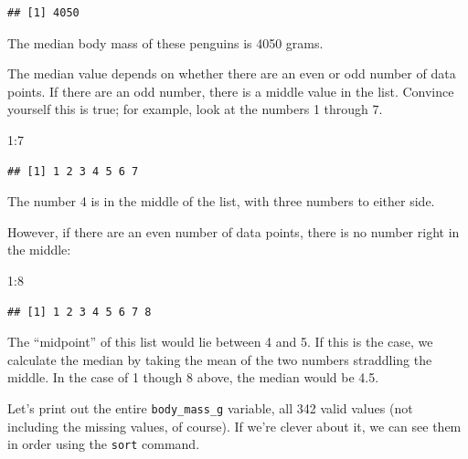\documentclass[
]{book}
\newenvironment{Shaded}{\begin{snugshade}}{\end{snugshade}}
\newcommand{\DecValTok}[1]{\textcolor[rgb]{0.00,0.00,0.81}{#1}}
\newcommand{\FunctionTok}[1]{\textcolor[rgb]{0.00,0.00,0.00}{#1}}
\newcommand{\NormalTok}[1]{#1}
\newcommand{\SpecialCharTok}[1]{\textcolor[rgb]{0.00,0.00,0.00}{#1}}
\begin{document}
\begin{verbatim}
## [1] 4050
\end{verbatim}

The median body mass of these penguins is 4050 grams.

The median value depends on whether there are an even or odd number of data points. If there are an odd number, there is a middle value in the list. Convince yourself this is true; for example, look at the numbers 1 through 7.

\begin{Shaded}
\begin{Highlighting}[]
\DecValTok{1}\SpecialCharTok{:}\DecValTok{7}
\end{Highlighting}
\end{Shaded}

\begin{verbatim}
## [1] 1 2 3 4 5 6 7
\end{verbatim}

The number 4 is in the middle of the list, with three numbers to either side.

However, if there are an even number of data points, there is no number right in the middle:

\begin{Shaded}
\begin{Highlighting}[]
\DecValTok{1}\SpecialCharTok{:}\DecValTok{8}
\end{Highlighting}
\end{Shaded}

\begin{verbatim}
## [1] 1 2 3 4 5 6 7 8
\end{verbatim}

The ``midpoint'' of this list would lie between 4 and 5. If this is the case, we calculate the median by taking the mean of the two numbers straddling the middle. In the case of 1 though 8 above, the median would be 4.5.

Let's print out the entire \texttt{body\_mass\_g} variable, all 342 valid values (not including the missing values, of course). If we're clever about it, we can see them in order using the \texttt{sort} command.

\begin{Shaded}
\end{Shaded}
\end{document}
